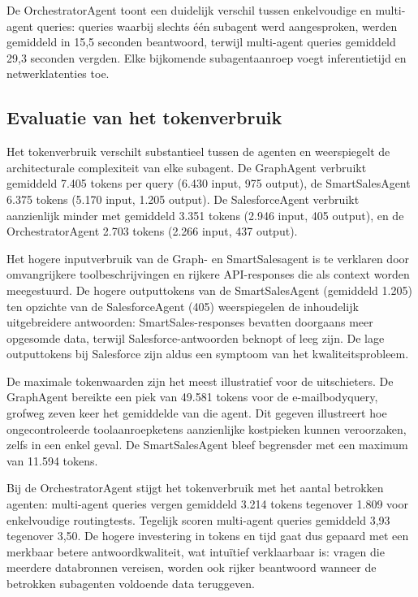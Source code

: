 De OrchestratorAgent toont een duidelijk verschil tussen enkelvoudige en multi-agent queries: queries waarbij slechts één subagent werd aangesproken, werden gemiddeld in 15,5 seconden beantwoord, terwijl multi-agent queries gemiddeld 29,3 seconden vergden. Elke bijkomende subagentaanroep voegt inferentietijd en netwerklatenties toe.

\subsection{Evaluatie van het tokenverbruik}
\label{subsec:tokenverbruik}

Het tokenverbruik verschilt substantieel tussen de agenten en weerspiegelt de architecturale complexiteit van elke subagent. De GraphAgent verbruikt gemiddeld 7.405 tokens per query (6.430 input, 975 output), de SmartSalesAgent 6.375 tokens (5.170 input, 1.205 output). De SalesforceAgent verbruikt aanzienlijk minder met gemiddeld 3.351 tokens (2.946 input, 405 output), en de OrchestratorAgent 2.703 tokens (2.266 input, 437 output).

Het hogere inputverbruik van de Graph- en SmartSalesagent is te verklaren door omvangrijkere toolbeschrijvingen en rijkere API-responses die als context worden meegestuurd. De hogere outputtokens van de SmartSalesAgent (gemiddeld 1.205) ten opzichte van de SalesforceAgent (405) weerspiegelen de inhoudelijk uitgebreidere antwoorden: SmartSales-responses bevatten doorgaans meer opgesomde data, terwijl Salesforce-antwoorden beknopt of leeg zijn. De lage outputtokens bij Salesforce zijn aldus een symptoom van het kwaliteitsprobleem.

De maximale tokenwaarden zijn het meest illustratief voor de uitschieters. De GraphAgent bereikte een piek van 49.581 tokens voor de e-mailbodyquery, grofweg zeven keer het gemiddelde van die agent. Dit gegeven illustreert hoe ongecontroleerde toolaanroepketens aanzienlijke kostpieken kunnen veroorzaken, zelfs in een enkel geval. De SmartSalesAgent bleef begrensder met een maximum van 11.594 tokens.

Bij de OrchestratorAgent stijgt het tokenverbruik met het aantal betrokken agenten: multi-agent queries vergen gemiddeld 3.214 tokens tegenover 1.809 voor enkelvoudige routingtests. Tegelijk scoren multi-agent queries gemiddeld 3,93 tegenover 3,50. De hogere investering in tokens en tijd gaat dus gepaard met een merkbaar betere antwoordkwaliteit, wat intuïtief verklaarbaar is: vragen die meerdere databronnen vereisen, worden ook rijker beantwoord wanneer de betrokken subagenten voldoende data teruggeven.

